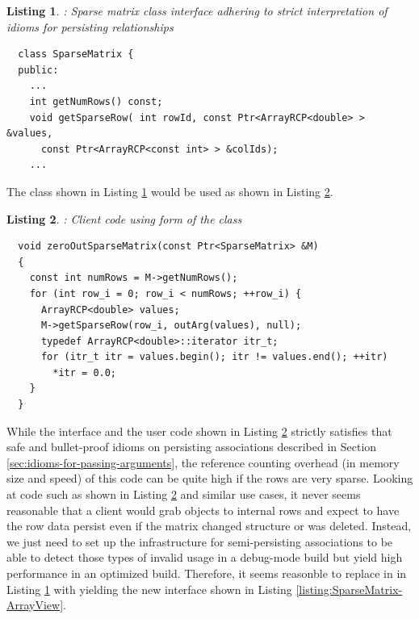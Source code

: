 \documentclass[pdf,ps2pdf,11pt]{SANDreport}
\newtheorem{listing}{Listing}
\begin{document}
\begin{listing}: Sparse matrix class interface adhering to strict
interpretation of idioms for persisting relationships  \\
\label{listing:SparseMatrix-ArrayRCP}
{\small\begin{verbatim}
  class SparseMatrix {
  public:
    ...
    int getNumRows() const;
    void getSparseRow( int rowId, const Ptr<ArrayRCP<double> > &values,
      const Ptr<ArrayRCP<const int> > &colIds);
    ...
\end{verbatim}}
\end{listing}


The {} class shown in Listing
{}\ref{listing:SparseMatrix-ArrayRCP} would be used as shown in
Listing {}\ref{listing:zeroOutSparseMatrix-ArrayRCP}.


\begin{listing}: Client code using {} form of the
 {} class  \\
\label{listing:zeroOutSparseMatrix-ArrayRCP}
{\small\begin{verbatim}
  void zeroOutSparseMatrix(const Ptr<SparseMatrix> &M)
  {
    const int numRows = M->getNumRows();
    for (int row_i = 0; row_i < numRows; ++row_i) {
      ArrayRCP<double> values;
      M->getSparseRow(row_i, outArg(values), null);
      typedef ArrayRCP<double>::iterator itr_t;
      for (itr_t itr = values.begin(); itr != values.end(); ++itr)
        *itr = 0.0;
    }
  }
\end{verbatim}}
\end{listing}


While the interface and the user code shown in Listing
{}\ref{listing:zeroOutSparseMatrix-ArrayRCP} strictly satisfies that
safe and bullet-proof idioms on persisting associations described in
Section {}\ref{sec:idioms-for-passing-arguments}, the reference
counting overhead (in memory size and speed) of this code can be quite
high if the rows are very sparse.  Looking at code such as shown in
Listing {}\ref{listing:zeroOutSparseMatrix-ArrayRCP} and similar use
cases, it never seems reasonable that a client would grab
{} objects to internal rows and expect to have the
row data persist even if the matrix changed structure or was deleted.
Instead, we just need to set up the infrastructure for semi-persisting
associations to be able to detect those types of invalid usage in a
debug-mode build but yield high performance in an optimized build.
Therefore, it seems reasonble to replace {} in
{} in Listing
{}\ref{listing:SparseMatrix-ArrayRCP} with {}
yielding the new {} interface shown in Listing
{}\ref{listing:SparseMatrix-ArrayView}.
\end{document}
